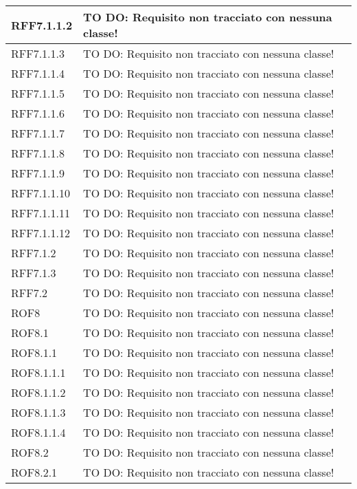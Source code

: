 \begin{center}
\begin{longtable}{| p{2.5cm} | p{11cm} |}
\hline
RFF7.1.1.2 & TO DO: Requisito non tracciato con nessuna classe! \\
\hline
RFF7.1.1.3 & TO DO: Requisito non tracciato con nessuna classe! \\
\hline
RFF7.1.1.4 & TO DO: Requisito non tracciato con nessuna classe! \\
\hline
RFF7.1.1.5 & TO DO: Requisito non tracciato con nessuna classe! \\
\hline
RFF7.1.1.6 & TO DO: Requisito non tracciato con nessuna classe! \\
\hline
RFF7.1.1.7 & TO DO: Requisito non tracciato con nessuna classe! \\
\hline
RFF7.1.1.8 & TO DO: Requisito non tracciato con nessuna classe! \\
\hline
RFF7.1.1.9 & TO DO: Requisito non tracciato con nessuna classe! \\
\hline
RFF7.1.1.10 & TO DO: Requisito non tracciato con nessuna classe! \\
\hline
RFF7.1.1.11 & TO DO: Requisito non tracciato con nessuna classe! \\
\hline
RFF7.1.1.12 & TO DO: Requisito non tracciato con nessuna classe! \\
\hline
RFF7.1.2 & TO DO: Requisito non tracciato con nessuna classe! \\
\hline
RFF7.1.3 & TO DO: Requisito non tracciato con nessuna classe! \\
\hline
RFF7.2 & TO DO: Requisito non tracciato con nessuna classe! \\
\hline
ROF8 & TO DO: Requisito non tracciato con nessuna classe! \\
\hline
ROF8.1 & TO DO: Requisito non tracciato con nessuna classe! \\
\hline
ROF8.1.1 & TO DO: Requisito non tracciato con nessuna classe! \\
\hline
ROF8.1.1.1 & TO DO: Requisito non tracciato con nessuna classe! \\
\hline
ROF8.1.1.2 & TO DO: Requisito non tracciato con nessuna classe! \\
\hline
ROF8.1.1.3 & TO DO: Requisito non tracciato con nessuna classe! \\
\hline
ROF8.1.1.4 & TO DO: Requisito non tracciato con nessuna classe! \\
\hline
ROF8.2 & TO DO: Requisito non tracciato con nessuna classe! \\
\hline
ROF8.2.1 & TO DO: Requisito non tracciato con nessuna classe! \\
\hline

\end{longtable}
\end{center}
